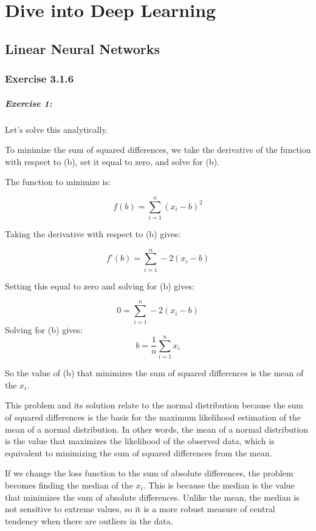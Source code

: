 \chapter{Dive into Deep Learning}\label{chp:dive-into-deep-learning}

\section{Linear Neural Networks} %
\label{sec:Linear Neural Networks}

\subsection{Exercise 3.1.6}

\paragraph{Exercise 1:}

Let’s solve this analytically.

To minimize the sum of squared differences, we take the derivative of the function with respect to (b), set it equal to zero, and solve for (b).

The function to minimize is:

\[
f(b) = \sum_{i=1}^{n} (x_i - b)^2
\]

Taking the derivative with respect to (b) gives:

$$
f’(b) = \sum_{i=1}^{n} -2(x_i - b)
$$

Setting this equal to zero and solving for (b) gives:

$$
0 = \sum_{i=1}^{n} -2(x_i - b)
$$
Solving for (b) gives:
$$
b = \frac{1}{n} \sum_{i=1}^{n} x_i
$$

So the value of (b) that minimizes the sum of squared differences is the mean of the \(x_i\).

This problem and its solution relate to the normal distribution because the sum of squared differences is the basis for the maximum likelihood estimation of the mean of a normal distribution.
In other words, the mean of a normal distribution is the value that maximizes the likelihood of the observed data, which is equivalent to minimizing the sum of squared differences from the mean.


If we change the loss function to the sum of absolute differences, the problem becomes finding the median of the \(x_i\).
This is because the median is the value that minimizes the sum of absolute differences.
Unlike the mean, the median is not sensitive to extreme values, so it is a more robust measure of central tendency when there are outliers in the data.

